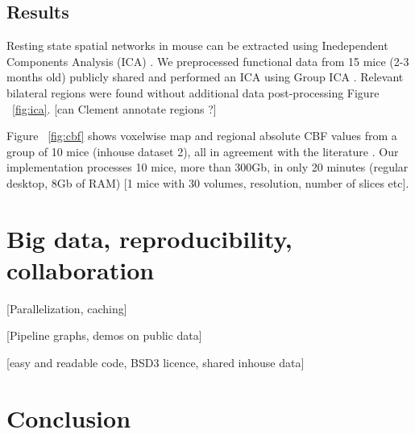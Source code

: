 \documentclass[utf8, a4paper, final, crop]{frontiersSCNS} %
\begin{document}
\subsection{Results}

Resting state spatial networks in mouse can be extracted using Inedependent Components Analysis (ICA) \citep{zerbi2015mapping, grandjean2019common}. We preprocessed functional data
from 15 mice (2-3 months old) publicly shared
\citep{zerbi2015mapping} and performed an ICA using Group ICA 
\citep{varoquaux2010group}. Relevant bilateral
regions were found without additional data post-processing Figure ~\ref{fig:ica}. [can Clement annotate regions ?]

Figure ~\ref{fig:cbf} shows voxelwise map and regional absolute CBF values from a group of 10 mice (inhouse dataset 2), all 
in agreement with the literature \citep{muir2008cerebral}. Our implementation processes 10 mice, more than 
300Gb, in only 20 minutes (regular desktop, 8Gb of RAM) [1 mice with 30 volumes, resolution, number of slices 
etc].

\section{Big data, reproducibility, collaboration}

[Parallelization, caching]

[Pipeline graphs, demos on public data]

[easy and readable code, BSD3 licence, shared inhouse data]

\section{Conclusion}
\end{document}
